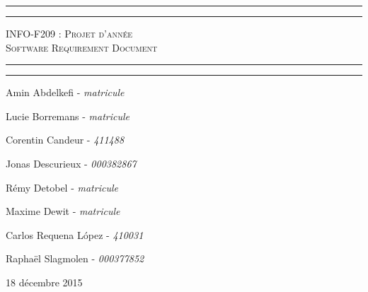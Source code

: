 \begin{titlepage}

\begin{center}
    \vspace*{\fill}
        \hrule
        \vspace*{2pt}
        \hrule
        \vspace*{15pt}
        \textsc{\Huge{INFO-F209 : Projet d'année \\\vspace*{8pt}
            Software Requirement Document}}
        \vspace*{15pt}
        \hrule
        \vspace*{2pt}
        \hrule
  \vspace*{\fill}
\end{center}
\null
\vfill

\hfill Amin Abdelkefi - \emph{matricule}

\hfill Lucie Borremans - \emph{matricule}

\hfill Corentin Candeur - \emph{411488}

\hfill Jonas Descurieux - \emph{000382867}

\hfill Rémy Detobel - \emph{matricule}

\hfill Maxime Dewit - \emph{matricule}

\hfill Carlos Requena López - \emph{410031}

\hfill Raphaël Slagmolen - \emph{000377852}

\large 18 décembre 2015

\end{titlepage}
